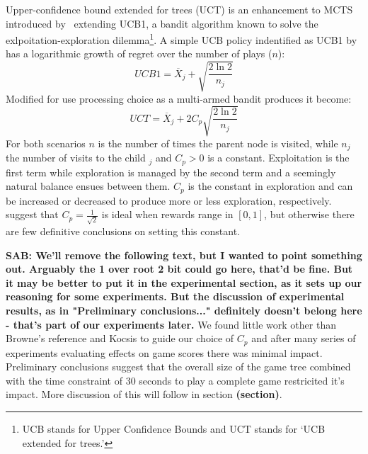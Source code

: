 \documentclass[letterpaper]{article}
\begin{document}
Upper-confidence bound extended for trees (UCT) is an enhancement to MCTS introduced by~\cite{kocsis2006improved} extending UCB1, a bandit algorithm known to solve the exlpoitation-exploration dilemma\footnote{UCB stands for Upper Confidence Bounds and UCT stands for `UCB extended for trees.'}. A simple UCB policy indentified as UCB1 by~\cite{auer2002finite} has a logarithmic growth of regret over the number of plays ($n$):
\begin{equation} \label{eq:UCB1}
UCB1 = \overline{X}_j + \sqrt{\frac{2\ln{2}}{n_j}}
\end{equation}
Modified for use processing choice as a multi-armed bandit produces it become:
\begin{equation} \label{eq:UCT}
UCT = \overline{X}_j + 2C_p\sqrt{\frac{2\ln{2}}{n_j}}
\end{equation}
For both scenarios $n$ is the number of times the parent node is visited, while $n_j$ the number of visits to the child $_j$ and $C_p > 0$ is a constant. Exploitation is the first term while exploration is managed by the second term and a seemingly natural balance ensues between them. $C_p$ is the constant in exploration and can be increased or decreased to produce more or less exploration, respectively. ~\cite{kocsis2006improved} suggest that $C_p = \frac{1}{\sqrt{2}}$ is ideal when rewards range in $[0,1]$, but otherwise there are few definitive conclusions on setting this constant.

{\bf SAB: We'll remove the following text, but I wanted to point something out. Arguably the 1 over root 2 bit could go here, that'd be fine. But it may be better to put it in the experimental section, as it sets up our reasoning for some experiments. But the discussion of experimental results, as in "Preliminary conclusions..." definitely doesn't belong here - that's part of our experiments later.}
We found little work other than Browne's reference and Kocsis to guide our choice of $C_p$ and after many series of experiments evaluating effects on game scores there was minimal impact. Preliminary conclusions  suggest that the overall size of the game tree combined with the time constraint of 30 seconds to play a complete game restricited it's impact. More discussion of this will follow in section {\bf(section)}.
\end{document}
